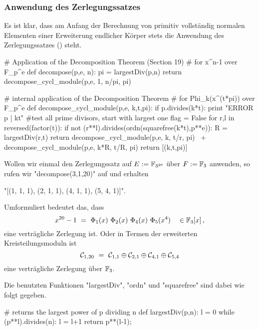\subsubsection{Anwendung des Zerlegungssatzes}
Es ist klar, dass am Anfang der Berechnung von primitiv vollständig normalen
Elementen einer Erweiterung endlicher Körper stets die Anwendung des
Zerlegungssatzes () steht.


\begin{sagecode}[caption={Aus \url{../Sage/enumeratePCNs.spyx}},
  firstnumber=544, label=lst:decompose]
# Application of the Decomposition Theorem (Section 19)
# for x^n-1 over F_p^e
def decompose(p,e, n):
    pi = largestDiv(p,n)
    return decompose_cycl_module(p,e, 1, n/pi, pi)
\end{sagecode}


\begin{sagecode}[caption={Aus \url{../Sage/enumeratePCNs.spyx}},
  firstnumber=571, label=lst:decompose_cycl_module]
# internal application of the Decomposition Theorem
# for Phi_k(x^(t*pi)) over F_p^e
def decompose_cycl_module(p,e, k,t,pi):
    if p.divides(k*t): print "ERROR p | kt"
    #test all prime divisors, start with largest one
    flag = False
    for r,l in reversed(factor(t)):
        if not (r**l).divides(ordn(squarefree(k*t),p**e)):
            R = largestDiv(r,t)
            return decompose_cycl_module(p,e, k, t/r, pi) \
                    + decompose_cycl_module(p,e, k*R, t/R, pi)
    return [(k,t,pi)]
\end{sagecode}

\begin{beispiel}
  Wollen wir einmal den Zerlegungssatz auf $E := \mathbb{F}_{3^{20}}$ über 
  $F := \mathbb{F}_3$ anwenden, so rufen wir "decompose(3,1,20)" auf und 
  erhalten
  \begin{center}
    "[(1, 1, 1), (2, 1, 1), (4, 1, 1), (5, 4, 1)]".
  \end{center}
  Umformuliert bedeutet das, dass
  \[ x^{20} - 1 \ =\  \Phi_1(x)\ \Phi_2(x)\ \Phi_4(x)\ \Phi_5(x^4)\quad
    \in \mathbb{F}_3[x]\,,\]
  eine verträgliche Zerlegung ist. 
  Oder in Termen der erweiterten Kreisteilungsmoduln ist 
  \[ \mathcal{C}_{1,20} \ =\  \mathcal{C}_{1,1} \oplus \mathcal{C}_{2,1} \oplus
    \mathcal{C}_{4,1} \oplus \mathcal{C}_{5,4}\]
  eine verträgliche Zerlegung über $\mathbb{F}_3$.
\end{beispiel}

Die benutzten Funktionen "largestDiv", "ordn" und "squarefree" sind dabei 
wie folgt gegeben.

\begin{sagecode}[caption={Aus \url{../Sage/enumeratePCNs.spyx}},
  firstnumber=586]
# returns the largest power of p dividing n
def largestDiv(p,n):
    l = 0
    while (p**l).divides(n):
        l = l+1
    return p**(l-1);
\end{sagecode}



